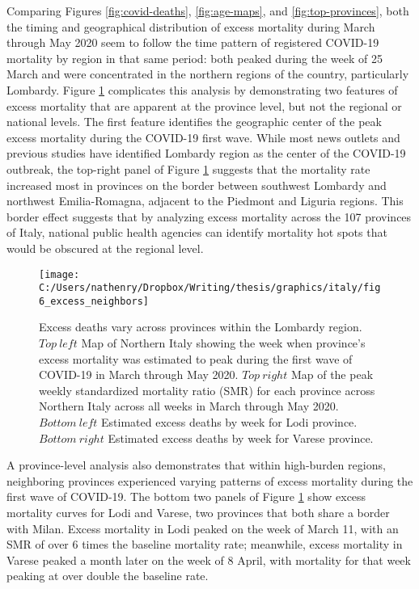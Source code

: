 \documentclass[
]{article}
\begin{document}
Comparing Figures \ref{fig:covid-deaths}, \ref{fig:age-maps}, and \ref{fig:top-provinces}, both the timing and geographical distribution of excess mortality during March through May 2020 seem to follow the time pattern of registered COVID-19 mortality by region in that same period: both peaked during the week of 25 March and were concentrated in the northern regions of the country, particularly Lombardy. Figure \ref{fig:excess-neighbors} complicates this analysis by demonstrating two features of excess mortality that are apparent at the province level, but not the regional or national levels. The first feature identifies the geographic center of the peak excess mortality during the COVID-19 first wave. While most news outlets and previous studies have identified Lombardy region as the center of the COVID-19 outbreak, the top-right panel of Figure \ref{fig:excess-neighbors} suggests that the mortality rate increased most in provinces on the border between southwest Lombardy and northwest Emilia-Romagna, adjacent to the Piedmont and Liguria regions. This border effect suggests that by analyzing excess mortality across the 107 provinces of Italy, national public health agencies can identify mortality hot spots that would be obscured at the regional level.

\begin{figure}[H]

{\centering \texttt{[image: C:/Users/nathenry/Dropbox/Writing/thesis/graphics/italy/fig6\_excess\_neighbors]} 

}

\caption{Excess deaths vary across provinces within the Lombardy region. \(Top\ left\) Map of Northern Italy showing the week when province’s excess mortality was estimated to peak during the first wave of COVID-19 in March through May 2020. \(Top\ right\) Map of the peak weekly standardized mortality ratio (SMR) for each province across Northern Italy across all weeks in March through May 2020. \(Bottom\ left\) Estimated excess deaths by week for Lodi province. \(Bottom\ right\) Estimated excess deaths by week for Varese province.}\label{fig:excess-neighbors}
\end{figure}

A province-level analysis also demonstrates that within high-burden regions, neighboring provinces experienced varying patterns of excess mortality during the first wave of COVID-19. The bottom two panels of Figure \ref{fig:excess-neighbors} show excess mortality curves for Lodi and Varese, two provinces that both share a border with Milan. Excess mortality in Lodi peaked on the week of March 11, with an SMR of over 6 times the baseline mortality rate; meanwhile, excess mortality in Varese peaked a month later on the week of 8 April, with mortality for that week peaking at over double the baseline rate.
\end{document}
